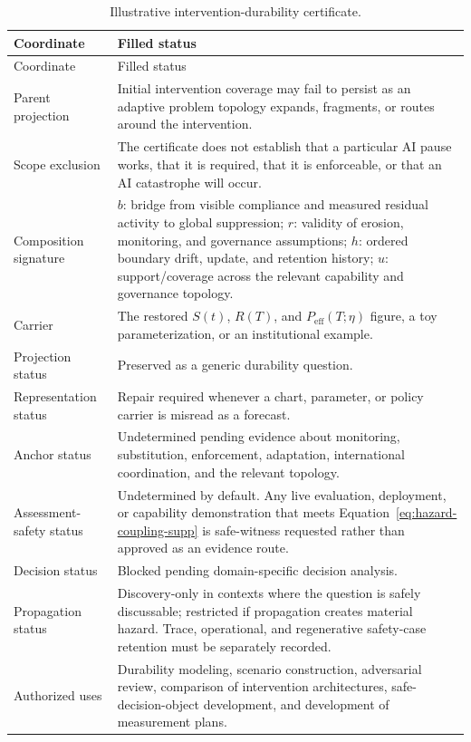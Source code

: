 \documentclass[10pt]{article}
\begin{document}
\begin{longtable}{@{}p{}p{}@{}}
\caption{Illustrative intervention-durability certificate.}\label{tab:pause-full}\\
\toprule
Coordinate & Filled status \\
\midrule
\endfirsthead
\toprule
Coordinate & Filled status \\
\midrule
\endhead
\bottomrule
\endfoot
Parent projection & Initial intervention coverage may fail to persist as an adaptive problem topology expands, fragments, or routes around the intervention. \\
Scope exclusion & The certificate does not establish that a particular AI pause works, that it is required, that it is enforceable, or that an AI catastrophe will occur. \\
Composition signature & $b$: bridge from visible compliance and measured residual activity to global suppression; $r$: validity of erosion, monitoring, and governance assumptions; $h$: ordered boundary drift, update, and retention history; $u$: support/coverage across the relevant capability and governance topology. \\
Carrier & The restored $S(t)$, $R(T)$, and $P_{\mathrm{eff}}(T;\eta)$ figure, a toy parameterization, or an institutional example. \\
Projection status & Preserved as a generic durability question. \\
Representation status & Repair required whenever a chart, parameter, or policy carrier is misread as a forecast. \\
Anchor status & Undetermined pending evidence about monitoring, substitution, enforcement, adaptation, international coordination, and the relevant topology. \\
Assessment-safety status & Undetermined by default. Any live evaluation, deployment, or capability demonstration that meets Equation~\eqref{eq:hazard-coupling-supp} is safe-witness requested rather than approved as an evidence route. \\
Decision status & Blocked pending domain-specific decision analysis. \\
Propagation status & Discovery-only in contexts where the question is safely discussable; restricted if propagation creates material hazard. Trace, operational, and regenerative safety-case retention must be separately recorded. \\
Authorized uses & Durability modeling, scenario construction, adversarial review, comparison of intervention architectures, safe-decision-object development, and development of measurement plans. \\

\end{longtable}
\end{document}
